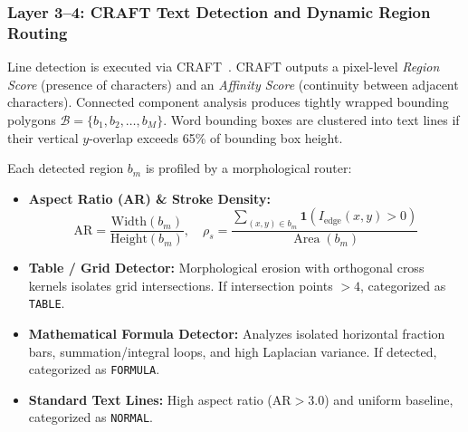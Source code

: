 \documentclass[journal]{IEEEtran}
\begin{document}
\subsubsection{Layer 3--4: CRAFT Text Detection and Dynamic Region Routing}
Line detection is executed via CRAFT~\cite{baek2019character}. CRAFT outputs a pixel-level \textit{Region Score} (presence of characters) and an \textit{Affinity Score} (continuity between adjacent characters). Connected component analysis produces tightly wrapped bounding polygons $\mathcal{B} = \{b_1, b_2, \dots, b_M\}$. Word bounding boxes are clustered into text lines if their vertical $y$-overlap exceeds 65\% of bounding box height.

Each detected region $b_m$ is profiled by a morphological router:
\begin{itemize}
    \item \textbf{Aspect Ratio (AR) \& Stroke Density:}
    \begin{equation}
        \text{AR} = \frac{\text{Width}(b_m)}{\text{Height}(b_m)}, \quad \rho_s = \frac{\sum_{(x,y) \in b_m} \mathbf{1}(I_{\text{edge}}(x,y) > 0)}{\operatorname{Area}(b_m)}
    \end{equation}
    \item \textbf{Table / Grid Detector:} Morphological erosion with orthogonal cross kernels isolates grid intersections. If intersection points $> 4$, categorized as \texttt{TABLE}.
    \item \textbf{Mathematical Formula Detector:} Analyzes isolated horizontal fraction bars, summation/integral loops, and high Laplacian variance. If detected, categorized as \texttt{FORMULA}.
    \item \textbf{Standard Text Lines:} High aspect ratio ($\text{AR} > 3.0$) and uniform baseline, categorized as \texttt{NORMAL}.
\end{itemize}
\end{document}
